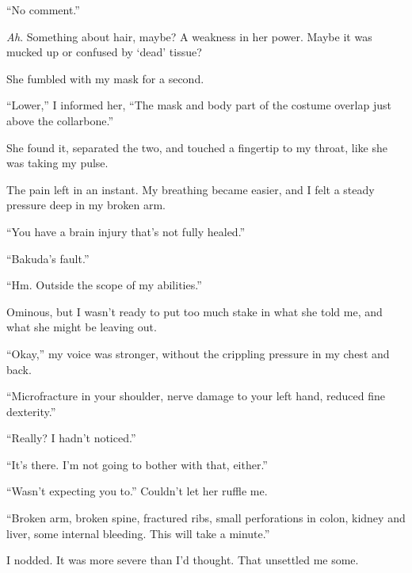 ``No comment.''



\emph{Ah}.  Something about hair, maybe?  A weakness in her power.  Maybe it was mucked up or confused by `dead' tissue?



She fumbled with my mask for a second.



``Lower,'' I informed her, ``The mask and body part of the costume overlap just above the collarbone.''



She found it, separated the two, and touched a fingertip to my throat, like she was taking my pulse.



The pain left in an instant.  My breathing became easier, and I felt a steady pressure deep in my broken arm.



``You have a brain injury that's not fully healed.''



``Bakuda's fault.''



``Hm.  Outside the scope of my abilities.''



Ominous, but I wasn't ready to put too much stake in what she told me, and what she might be leaving out.



``Okay,'' my voice was stronger, without the crippling pressure in my chest and back.



``Microfracture in your shoulder, nerve damage to your left hand, reduced fine dexterity.''



``Really?  I hadn't noticed.''



``It's there.  I'm not going to bother with that, either.''



``Wasn't expecting you to.''  Couldn't let her ruffle me.



``Broken arm, broken spine, fractured ribs, small perforations in colon, kidney and liver, some internal bleeding.  This will take a minute.''



I nodded.  It was more severe than I'd thought.  That unsettled me some.



